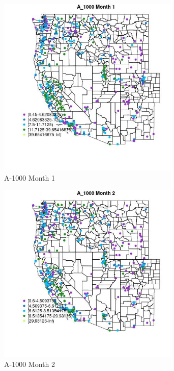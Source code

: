 \begin{figure} 
\centering  
\includegraphics[width=0.77\textwidth]{Code_Outputs/ML_input_report_ML_input_PM25_Step5_part_d_de_duplicated_aves_ML_input_MapObsMo1A_1000.jpg} 
\caption{\label{fig:ML_input_report_ML_input_PM25_Step5_part_d_de_duplicated_aves_ML_inputMapObsMo1A_1000}A-1000 Month 1} 
\end{figure} 
 

\begin{figure} 
\centering  
\includegraphics[width=0.77\textwidth]{Code_Outputs/ML_input_report_ML_input_PM25_Step5_part_d_de_duplicated_aves_ML_input_MapObsMo2A_1000.jpg} 
\caption{\label{fig:ML_input_report_ML_input_PM25_Step5_part_d_de_duplicated_aves_ML_inputMapObsMo2A_1000}A-1000 Month 2} 
\end{figure} 
 

